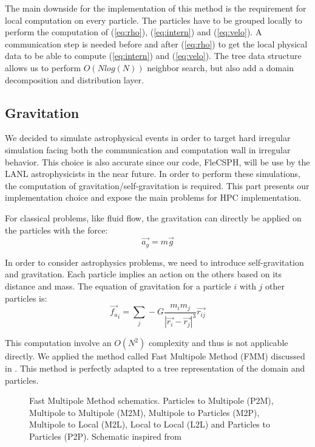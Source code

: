 The main downside for the implementation of this method is the requirement for local computation on every particle. 
The particles have to be grouped locally to perform the computation of (\ref{eq:rho}), (\ref{eq:intern}) and (\ref{eq:velo}).
A communication step is needed before and after (\ref{eq:rho}) to get the local physical data to be able to compute (\ref{eq:intern}) and (\ref{eq:velo}).
The tree data structure allows us to perform $O(Nlog(N))$ neighbor search, but also add a domain decomposition and distribution layer.

\subsection{Gravitation}
We decided to simulate astrophysical events in order to target hard irregular simulation facing both the communication and computation wall in irregular behavior. 
This choice is also accurate since our code, FleCSPH, will be use by the LANL astrophysicists in the near future. 
In order to perform these simulations, the computation of gravitation/self-gravitation is required. 
This part presents our implementation choice and expose the main problems for HPC implementation. 


For classical problems, like fluid flow, the gravitation can directly be applied on the particles with the force:
\begin{equation}
	\vec{a_g} = m\vec{g}
\end{equation}

In order to consider astrophysics problems, we need to introduce self-gravitation and gravitation. 
Each particle implies an action on the others based on its distance and mass. 
The equation of gravitation for a particle $i$ with $j$ other particles is: 
\begin{equation}
	\vec{f_a}_i = \sum_j -G \frac{m_i m_j}{|\vec{r_i}-\vec{r_j}|^3} \vec{r_{ij}}
	\label{eq:gravitation}
\end{equation}

This computation involve an $O(N^2)$ complexity and thus is not applicable directly. 
We applied the method called Fast Multipole Method (FMM) discussed in \cite{beatson1997short}.
This method is perfectly adapted to a tree representation of the domain and particles. 

\begin{figure}[ht!]

\caption{Fast Multipole Method schematics. Particles to Multipole (P2M), Multipole to Multipole (M2M), Multipole to Particles (M2P), Multipole to Local (M2L), Local to Local (L2L) and Particles to Particles (P2P). Schematic inspired from \cite{yokota2011treecode}}
\label{fig:gravitation_fmm}
\end{figure}

